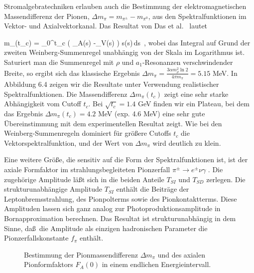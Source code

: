 Stromalgebratechniken erlauben auch die Bestimmung der elektromagnetischen
Massendifferenz der Pionen, $\Delta m_\pi=m_{\pi^\pm}-m_{\pi^0}$, aus
den Spektralfunktionen im Vektor- und Axialvektorkanal. Das Resultat 
von Das et al.~\cite{DGM67} lautet

\be
\label{dmpi}
 \Delta m_\pi (t_c) = 
    \int_0^{t_c} \big( \rho_A(s) -\rho_V(s) \big) s\ln (s)\,ds\, ,
\ee
wobei das Integral auf Grund der zweiten Weinberg-Summenregel unabh\"angig
von der Skala im Logarithmus ist. Saturiert man die Summenregel mit
$\rho$ und $a_1$-Resonanzen verschwindender Breite, so ergibt sich das
klassische Ergebnis $\Delta m_\pi=\frac{3\alpha m_\rho^2 \ln 2}{4\pi m_\pi}
=5.15$ MeV. In Abbildung 6.4 zeigen wir die Resultate unter Verwendung
realistischer Spektralfunktionen. Die Massendifferenz $\Delta m_\pi (t_c)$
zeigt eine sehr starke Abh\"angigkeit vom Cutoff $t_c$. Bei $\sqrt {t_c} 
= 1.4$ GeV finden wir ein Plateau, bei dem das Ergebnis  $\Delta m_\pi (t_c)=
4.2$ MeV (exp. 4.6 MeV) eine sehr gute \"Ubereinstimmung mit dem 
experimentellen Resultat zeigt. Wie bei den Weinberg-Summenregeln 
dominiert f\"ur gr\"o\ss ere Cutoffs $t_c$ die Vektorspektralfunktion, und    
der Wert von $\Delta m_\pi$ wird deutlich zu klein.  

Eine weitere Gr\"o\ss e, die sensitiv auf die Form der Spektralfunktionen 
ist, ist der axiale Formfaktor im strahlungsbegleiteten Pionzerfall
$\pi^\pm\to e^\pm\nu\gamma$ \cite{BDL82}. Die zugeh\"orige Amplitude 
l\"a\ss t sich in die beiden Anteile $T_{SI}$ und $T_{SD}$ zerlegen. 
Die strukturunabh\"angige Amplitude $T_{SI}$ enth\"alt die Beitr\"age
der Leptonbremsstrahlung, des Pionpolterms sowie des Pionkontaktterms.
Diese Amplituden lassen sich ganz analog zur Photoproduktionsamplitude 
in Bornapproximation berechnen. Das Resultat ist strukturunabh\"angig 
in dem Sinne, da\ss\ die Amplitude als einzigen hadronischen Parameter 
die Pionzerfallskonstante $f_\pi$ enth\"alt. 
\begin{figure}
\caption{Bestimmung der Pionmassendifferenz $\Delta m_\pi$ und des axialen 
Pionformfaktors $F_A(0)$ in einem endlichen Energieintervall.}
\vspace{20cm}
\end{figure}

